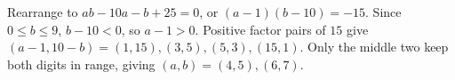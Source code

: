 Rearrange to $ab-10a-b+25=0$, or $(a-1)(b-10)=-15$. Since $0\le b\le9$, $b-10<0$, so $a-1>0$. Positive factor pairs of $15$ give $(a-1,10-b)=(1,15),(3,5),(5,3),(15,1)$. Only the middle two keep both digits in range, giving $\boxed{(a,b)=(4,5),(6,7)}$.
